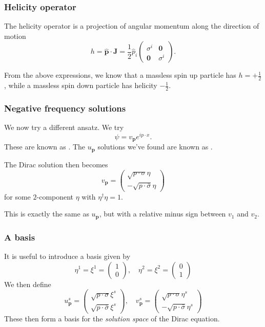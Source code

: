 \documentclass[a4paper]{article}
\begin{document}
\subsubsection*{Helicity operator}
\begin{defi}
 The helicity operator is a projection of angular momentum along the direction of motion
 \[
   h = \hat{\mathbf{p}}\cdot \mathbf{J} = \frac{1}{2} \hat{p}_i
   \begin{pmatrix}
     \sigma^i & \mathbf{0}\\
     \mathbf{0} & \sigma^i
   \end{pmatrix}.
 \]
\end{defi}
From the above expressions, we know that a massless spin up particle has $h = + \frac{1}{2}$, while a massless spin down particle has helicity $-\frac{1}{2}$. %

\subsubsection*{Negative frequency solutions}
We now try a different ansatz. We try
\[
  \psi = v_\mathbf{p} e^{i p\cdot x}.
\]
These are known as . The $u_\mathbf{p}$ solutions we've found are known as .

The Dirac solution then becomes
\[
  v_\mathbf{p} =
  \begin{pmatrix}
    \sqrt{p \cdot \sigma} \eta\\
    -\sqrt{p \cdot \bar\sigma} \eta
  \end{pmatrix}
\]
for some $2$-component $\eta$ with $\eta^\dagger \eta = 1$.

This is exactly the same as $u_\mathbf{p}$, but with a relative minus sign between $v_1$ and $v_2$.

\subsubsection*{A basis}
It is useful to introduce a basis given by
\[
  \eta^1 = \xi^1 =
  \begin{pmatrix}
    1\\0
  \end{pmatrix},\quad \eta^2 = \xi^2 =
  \begin{pmatrix}
    0\\1
  \end{pmatrix}
\]
We then define
\[
  u^s_\mathbf{p} =
  \begin{pmatrix}
    \sqrt{p\cdot \sigma} \xi^s\\
    \sqrt{p\cdot \bar\sigma} \xi^s
  \end{pmatrix}
  ,\quad v^s_\mathbf{p} =
  \begin{pmatrix}
    \sqrt{p\cdot \sigma} \eta^s\\
    -\sqrt{p\cdot \bar\sigma} \eta^s
  \end{pmatrix}
\]
These then form a basis for the \emph{solution space} of the Dirac equation.
\end{document}
